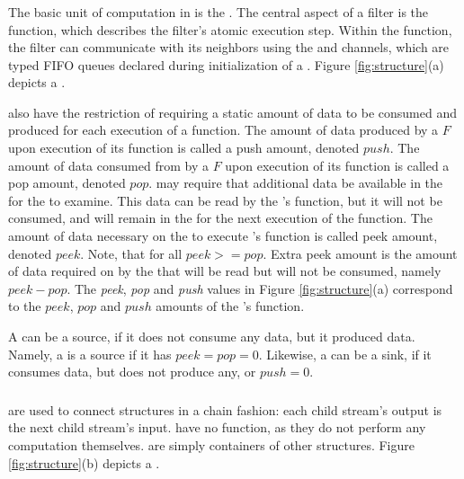 \subsubsection{\filters}

The basic unit of computation in {\StreamIt} is the {\filter}. The
central aspect of a filter is the {\work} function, which
describes the filter's atomic execution step. Within the {\work}
function, the filter can communicate with its neighbors using the
{\Input} and {\Output} channels, which are typed FIFO queues
declared during initialization of a {\filter}.  Figure
\ref{fig:structure}(a) depicts a {\filter}.

{\filters} also have the restriction of requiring a static amount
of data to be consumed and produced for each execution of a
{\work} function.  The amount of data produced by a {\filter} $F$
upon execution of its {\work} function is called a push amount,
denoted $push$. The amount of data consumed from {\Input}
{{\Channel}} by a {\filter} $F$ upon execution of its {\work}
function is called a pop amount, denoted $pop$.  {\filters} may
require that additional data be available in the {\Input}
{{\Channel}} for the {\filter} to examine.  This data can be read by
the {\filter}'s {\work} function, but it will not be consumed, and
will remain in the {{\Channel}} for the next execution of the
{\work} function.  The amount of data necessary on the {\Input}
{{\Channel}} to execute {\filter}'s {\work} function is called peek
amount, denoted $peek$.  Note, that for all {\filters} $peek
>= pop$.  Extra peek amount is the amount of data required on by
the {\filter} that will be read but will not be consumed, namely
$peek - pop$.  The \emph{peek}, \emph{pop} and \emph{push} values
in Figure \ref{fig:structure}(a) correspond to the $peek$, $pop$
and $push$ amounts of the {\filter}'s {\work} function.

A {\filter} can be a source, if it does not consume any data, but
it produced data.  Namely, a {\filter} is a source if it has $peek
= pop = 0$. Likewise, a {\filter} can be a sink, if it consumes
data, but does not produce any, or $push = 0$.

\subsubsection{\pipelines}

{\pipelines} are used to connect {\StreamIt} structures in a chain
fashion: each child stream's output is the next child stream's
input. {\pipelines} have no {\work} function, as they do not perform
any computation themselves. {\pipelines} are simply containers of
other {\StreamIt} structures.  Figure \ref{fig:structure}(b) depicts
a {\pipeline}.

